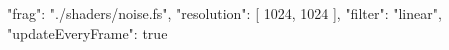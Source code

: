 {
  "frag": "./shaders/noise.fs",
  "resolution": [
    1024,
    1024
  ],
  "filter": "linear",
  "updateEveryFrame": true
}
